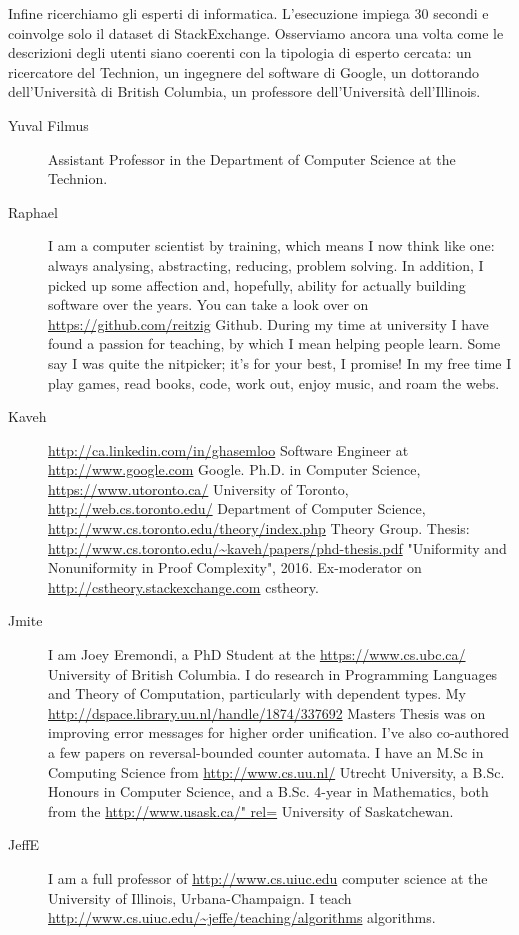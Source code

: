 Infine ricerchiamo gli esperti di informatica. L'esecuzione impiega 30 secondi e coinvolge solo il dataset di StackExchange. Osserviamo ancora una volta come le descrizioni degli utenti siano coerenti con la tipologia di esperto cercata: un ricercatore del Technion, un ingegnere del software di Google, un dottorando dell'Università di British Columbia, un professore dell'Università dell'Illinois.

\begin{description}
\item[Yuval Filmus]Assistant Professor in the Department of Computer Science at the Technion.
\item[Raphael]I am a computer scientist by training, which means I now think like one: always analysing,  abstracting, reducing, problem solving. In addition, I picked up some affection and, hopefully, ability for actually building software over the years. You can take a look over on \url{https://github.com/reitzig} Github. During my time at university I have found a passion for teaching, by which I mean helping people learn. Some say I was quite the nitpicker; it's for your best, I promise! In my free time I play games, read books, code, work out, enjoy music, and roam the webs.
\item[Kaveh]\url{http://ca.linkedin.com/in/ghasemloo} Software Engineer at \url{http://www.google.com} Google. Ph.D. in Computer Science, \url{https://www.utoronto.ca/} University of Toronto, \url{http://web.cs.toronto.edu/} Department of Computer Science, \url{http://www.cs.toronto.edu/theory/index.php} Theory Group. Thesis: \url{http://www.cs.toronto.edu/~kaveh/papers/phd-thesis.pdf} "Uniformity and Nonuniformity in Proof Complexity", 2016. Ex-moderator on \url{http://cstheory.stackexchange.com} cstheory.
\item[Jmite]I am Joey Eremondi, a PhD Student at the \url{https://www.cs.ubc.ca/} University of British Columbia. I do research in Programming Languages and Theory of Computation, particularly with dependent types. My \url{http://dspace.library.uu.nl/handle/1874/337692} Masters Thesis was on improving error messages for higher order unification. I've also co-authored a few papers on reversal-bounded counter automata. I have an M.Sc in Computing Science from \url{http://www.cs.uu.nl/} Utrecht University, a B.Sc. Honours in Computer Science, and a B.Sc. 4-year in Mathematics, both from the \url{http://www.usask.ca/" rel=} University of Saskatchewan.
\item[JeffE]I am a full professor of \url{http://www.cs.uiuc.edu} computer science at the University of Illinois, Urbana-Champaign.  I teach \url{http://www.cs.uiuc.edu/~jeffe/teaching/algorithms} algorithms.

\end{description}

